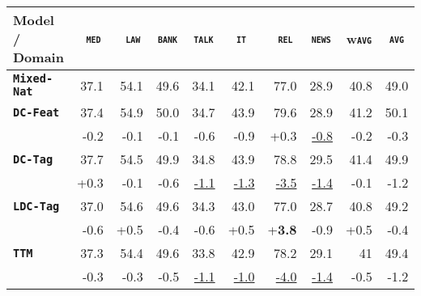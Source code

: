\documentclass[11pt,a4paper]{article}
\newcommand{\domain}[1]{\texttt{\textsc{#1}}}
\newcommand{\system}[1]{\texttt{\textbf{#1}}}
\newcommand{\SB}[1]{\textbf{#1}}
\newcommand{\SW}[1]{\underline{#1}}
\begin{document}
\begin{table*}
  \begin{tabular}{|p{2.5cm}|*{9}{r|}} \hline \footnotesize
    Model / Domain & \multicolumn{1}{c|}{\domain{ med}} & \multicolumn{1}{c|}{\domain{ law}} & \multicolumn{1}{c|}{\domain{bank}} & \multicolumn{1}{c|}{\domain{talk}} & \multicolumn{1}{c|}{\domain{ it }} & \multicolumn{1}{c|}{\domain{ rel}} & \multicolumn{1}{c|}{\domain{news}} & \multicolumn{1}{c|}{w\domain{avg}} & \multicolumn{1}{c|}{\domain{avg}} \\ \hline
     \system{Mixed-Nat}  & 37.1  & 54.1  & 49.6	& 34.1  & 42.1	& 77.0 & 28.9 & 40.8	& 49.0 \\ 
    \hline%
     \system{DC-Feat}     & 37.4 & 54.9   & 50.0    & 34.7  &  43.9  & 79.6 & 28.9  & 41.2 & 50.1\\[-2pt]
                   & \scriptsize -0.2 & \scriptsize -0.1  & \scriptsize -0.1 & \scriptsize -0.6 & \scriptsize -0.9 & \scriptsize +0.3 & \scriptsize \SW{-0.8} & \scriptsize -0.2 & \scriptsize -0.3\\

    \system{DC-Tag}      &  37.7 & 54.5   & 49.9    &  34.8 &  43.9  & 78.8 & 29.5  & 41.4 & 49.9\\[-2pt]
                   & \scriptsize +0.3  & \scriptsize -0.1   & \scriptsize -0.6    & \scriptsize \SW{-1.1}  &  \scriptsize \SW{-1.3}  & \scriptsize \SW{-3.5}  & \scriptsize \SW{-1.4}  & \scriptsize -0.1 & \scriptsize -1.2\\
    
    \system{LDC-Tag}    & 37.0   & 54.6  & 49.6    & 34.3  &  43.0  &77.0  & 28.7 & 40.8 & 49.2 \\[-2pt]
                    & \scriptsize -0.6 &	\scriptsize +0.5 & \scriptsize -0.4 & \scriptsize -0.6 &	\scriptsize +0.5 & \scriptsize +\SB{3.8} & \scriptsize -0.9 & \scriptsize +0.5 & \scriptsize -0.4 \\

    \system{TTM}           &  37.3 & 54.4   & 49.6    & 33.8  &  42.9  &78.2  & 29.1 & 41 & 49.4\\[-2pt]
                    & \scriptsize -0.3  & \scriptsize -0.3  & \scriptsize -0.5    & \scriptsize \SW{-1.1}  &  \scriptsize \SW{-1.0}  & \scriptsize \SW{-4.0}  & \scriptsize \SW{-1.4}& \scriptsize -0.5 & \scriptsize -1.2\\
    

\end{tabular}
\end{table*}
\end{document}
